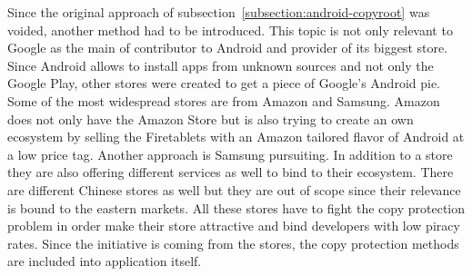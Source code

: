 Since the original approach of subsection~\ref{subsection:android-copyroot} was voided, another method had to be introduced.
This topic is not only relevant to Google as the main of contributor to Android and provider of its biggest store.
Since Android allows to install apps from unknown sources and not only the Google Play, other stores were created to get a piece of Google's Android pie.
Some of the most widespread stores are from Amazon and Samsung.
Amazon does not only have the Amazon Store but is also trying to create an own ecosystem by selling the Firetablets with an Amazon tailored flavor of Android at a low price tag.
Another approach is Samsung pursuiting. In addition to a store they are also offering different services as well to bind to their ecosystem.
There are different Chinese stores as well but they are out of scope since their relevance is bound to the eastern markets.
\newline
All these stores have to fight the copy protection problem in order make their store attractive and bind developers with low piracy rates.
Since the initiative is coming from the stores, the copy protection methods are included into application itself. \cite{munteanLicense}




